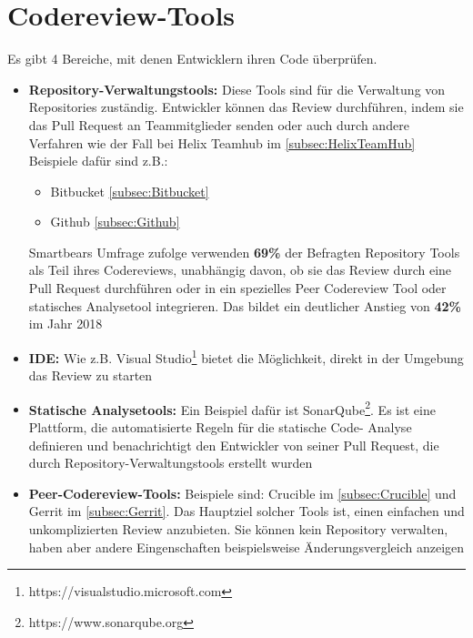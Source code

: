 \pagebreak

\section{Codereview-Tools}
\label{sec:Coderview-Tools}

Es gibt 4 Bereiche, mit denen Entwicklern ihren Code überprüfen.

\begin{itemize}
	\item \textbf{Repository-Verwaltungstools:} Diese Tools sind für die Verwaltung von Repositories zuständig. Entwickler können das Review durchführen, indem sie das Pull Request an
		Teammitglieder senden oder auch durch andere Verfahren wie der Fall bei Helix Teamhub im \cref{subsec:HelixTeamHub}
		Beispiele dafür sind z.B.:
		\begin{itemize}
			\item Bitbucket \cref{subsec:Bitbucket}
			\item Github \cref{subsec:Github}
		\end{itemize}
	
		Smartbears Umfrage zufolge verwenden \textbf{69\%} der Befragten Repository Tools als Teil ihres Codereviews, unabhängig davon, ob sie das Review durch eine Pull Request 					durchführen oder in ein spezielles Peer Codereview Tool oder statisches Analysetool integrieren. Das bildet ein deutlicher Anstieg von \textbf{42\%} im Jahr 2018 							\cite{smartbear}

	\item \textbf{\ac{IDE}:} Wie z.B. Visual Studio\footnote{https://visualstudio.microsoft.com} bietet die Möglichkeit, direkt in der Umgebung das Review zu starten

	\item \textbf{Statische Analysetools:} Ein Beispiel dafür ist SonarQube\footnote{https://www.sonarqube.org}. Es ist eine Plattform, die automatisierte Regeln für die statische Code-			Analyse definieren und benachrichtigt den Entwickler von seiner Pull Request, die durch Repository-Verwaltungstools erstellt wurden

	\item \textbf{Peer-Codereview-Tools:} Beispiele sind: Crucible im \cref{subsec:Crucible} und Gerrit im \cref{subsec:Gerrit}. Das Hauptziel solcher Tools ist, einen einfachen und 				unkomplizierten Review anzubieten. Sie können kein Repository verwalten, haben aber andere Eingenschaften beispielsweise Änderungsvergleich anzeigen
\end{itemize}


